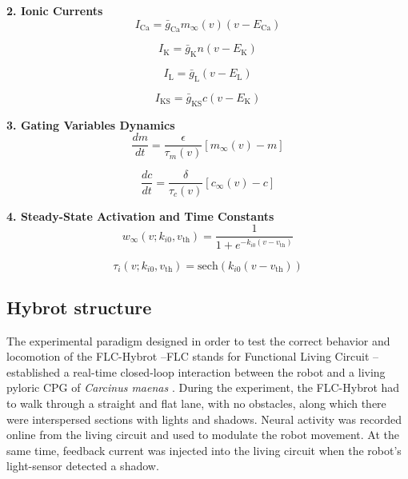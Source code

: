 \textbf{2. Ionic Currents}
\begin{equation}
I_{\text{Ca}} = \bar{g}_{\text{Ca}} m_{\infty}(v) (v - E_{\text{Ca}})
\end{equation}

\begin{equation}
I_{\text{K}} = \bar{g}_{\text{K}} n (v - E_{\text{K}})
\end{equation}

\begin{equation}
I_{\text{L}} = \bar{g}_{\text{L}} (v - E_{\text{L}})
\end{equation}

\begin{equation}
I_{\text{KS}} = \bar{g}_{\text{KS}} c (v - E_{\text{K}})
\end{equation}

\textbf{3. Gating Variables Dynamics}
\begin{equation}
\frac{dm}{dt} = \frac{\epsilon}{\tau_m(v)} [m_{\infty}(v) - m]
\end{equation}

\begin{equation}
\frac{dc}{dt} = \frac{\delta}{\tau_c(v)} [c_{\infty}(v) - c]
\end{equation}

\textbf{4. Steady-State Activation and Time Constants}
\begin{equation}
w_{\infty}(v; k_{i0}, v_{\text{th}}) = \frac{1}{1 + e^{-k_{i0} (v - v_{\text{th}})}}
\end{equation}

\begin{equation}
\tau_i(v; k_{i0}, v_{\text{th}}) = \text{sech}(k_{i0}(v - v_{\text{th}}))
\end{equation}

\subsection{Hybrot structure}
\label{sec:robot setup}
The experimental paradigm designed in order to test the correct behavior and locomotion of the FLC-Hybrot --FLC stands for Functional Living Circuit \parencite{soetard_dynamical_2023}-- established a real-time closed-loop interaction between the robot and a living pyloric CPG of \textit{Carcinus maenas} \parencite{elices_robust_2019}. During the experiment, the FLC-Hybrot had to walk through a straight and flat lane, with no obstacles, along which there were interspersed sections with lights and shadows. Neural activity was recorded online from the living circuit and used to modulate the robot movement. At the same time, feedback current was injected into the living circuit when the robot's light-sensor detected a shadow.

